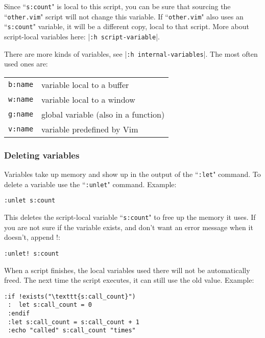 Since ``\texttt{s:count}" is local to this script, you can be sure that sourcing the ``\texttt{other.vim}" script will not change this variable.
If ``\texttt{other.vim}" also uses an ``\texttt{s:count}" variable, it will be a different copy, local to that script.
More about script-local variables here: |\texttt{:h script-variable}|.

There are more kinds of variables, see |\texttt{:h internal-variables}|.
The most often used ones are:

\begin{center} \begin{tabular}{l l}
				\texttt{b:name} & variable local to a buffer \\
				\texttt{w:name} & variable local to a window \\
				\texttt{g:name} & global variable (also in a function) \\
				\texttt{v:name} & variable predefined by Vim \\
\end{tabular} \end{center}
\subsubsection{Deleting variables}
Variables take up memory and show up in the output of the ``\texttt{:let}" command.
To delete a variable use the ``\texttt{:unlet}" command.
Example:

\begin{Verbatim}[samepage=true]
 :unlet s:count
\end{Verbatim}

This deletes the script-local variable ``\texttt{s:count}" to free up the memory it uses.
If you are not sure if the variable exists, and don't want an error message when it doesn't, append !:

\begin{Verbatim}[samepage=true]
 :unlet! s:count
\end{Verbatim}

When a script finishes, the local variables used there will not be automatically freed.
The next time the script executes, it can still use the old value.
Example:

\begin{Verbatim}[samepage=true]
 :if !exists("\texttt{s:call_count}")
 :  let s:call_count = 0
 :endif
 :let s:call_count = s:call_count + 1
 :echo "called" s:call_count "times"
\end{Verbatim}

